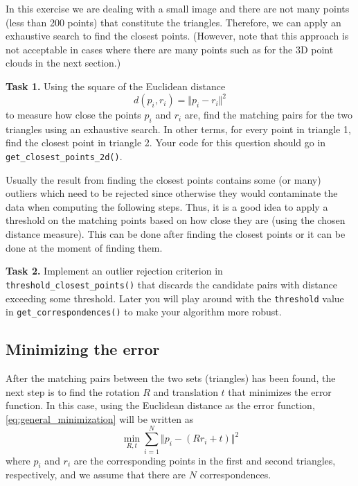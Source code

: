 \documentclass[a4paper,11pt]{article}
\begin{document}
In this exercise we are dealing with a small image and there are not many points
(less than 200 points) that constitute the triangles. Therefore, we can apply an
exhaustive search to find the closest points. (However, note that this approach
is not acceptable in cases where there are many points such as for the 3D point
clouds in the next section.)

{\bf Task 1.}   Using the square of the Euclidean distance 
\begin{equation*}
d(p_i,r_i) = \Vert p_i - r_i \Vert^2
\end{equation*}
to measure how close the points $p_i$ and $r_i$ are, find the matching pairs
for the two triangles using an exhaustive search. In other terms, for every
point in triangle 1, find the closest point in triangle 2.  Your code for this
question should go in \texttt{get\_closest\_points\_2d()}.

Usually the result from finding the closest points contains some (or many)
outliers which need to be rejected since otherwise they would contaminate the
data when computing the following steps. Thus, it is a good idea to apply a
threshold on the matching points based on how close they are (using the chosen
distance measure). This can be done after finding the closest points or it can
be done at the moment of finding them.

{\bf Task 2.}  Implement an outlier rejection criterion in \texttt{threshold\_closest\_points()}
that discards the candidate pairs with distance exceeding some threshold.   Later you will
play around with the \texttt{threshold} value in \texttt{get\_correspondences()} to make
your algorithm more robust.


\subsection{Minimizing the error}

After the matching pairs between the two sets (triangles) has been found, the
next step is to find the rotation $R$ and translation $t$ that minimizes the
error function. In this case, using the Euclidean distance as the error function,
\eqref{eq:general_minimization} will be written as
\begin{equation}
  \label{eq:1}
  \min_{R,t} \sum_{i=1}^N \Vert p_i - (Rr_i + t) \Vert^2
\end{equation}
where $p_i$ and $r_i$ are the corresponding points in the first and second
triangles, respectively, and we assume that there are $N$ correspondences.
\end{document}
